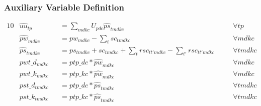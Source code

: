 \subsubsection{Auxiliary Variable Definition}
\label{auxiliary constraints}
\begin{alignat}{10}
	& \hat{uu}_{tp} 
		&& =  \sum_{mdkc} U_{pdc} \hat{ps}_{tmdkc} \quad
		&& \forall tp \\ 
	& \hat{pw}_{mdkc} 
		&& = pw_{mdkc} - \sum_{t} sc_{tmdkc} \quad 
		&& \forall mdkc \\ 
	& \hat{ps}_{tmdkc} 
		&& = ps_{tmdkc} + sc_{tmdkc} + 
		\sum_{t} rsc_{tt'mdkc} - \sum_{t'} rsc_{tt'mdkc} \quad 
		&& \forall tmdkc \\
	& pwt\_d_{mdkc} 
		&& = ptp\_{dc} * \hat{pw}_{mdkc} \quad
		&& \forall mdkc \\
	& pwt\_k_{mdkc} 
		&& = ptp\_{kc} * \hat{pw}_{mdkc} \quad
		&& \forall mdkc \\
	& pst\_d_{tmdkc} 
		&& = ptp\_{dc} * \hat{ps}_{tmdkc} \quad
		&& \forall tmdkc \\
	& pst\_k_{tmdkc} 
		&& = ptp\_{kc} * \hat{ps}_{tmdkc} \quad
		&& \forall tmdkc
\end{alignat}

